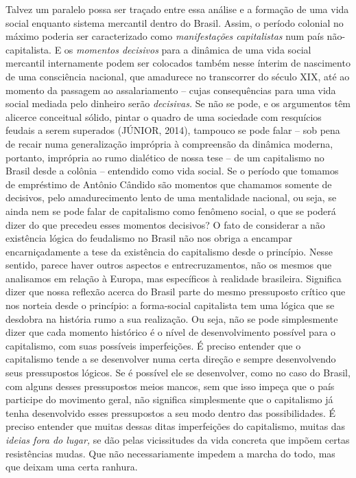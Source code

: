 Talvez um paralelo possa ser traçado entre essa análise e a formação de
uma vida social enquanto sistema mercantil dentro do Brasil. Assim, o
período colonial no máximo poderia ser caracterizado como
\emph{manifestações capitalistas} num país não-capitalista. E os
\emph{momentos decisivos} para a dinâmica de uma vida social mercantil
internamente podem ser colocados também nesse ínterim de nascimento de
uma consciência nacional, que amadurece no transcorrer do século XIX,
até ao momento da passagem ao assalariamento -- cujas consequências para
uma vida social mediada pelo dinheiro serão \emph{decisivas.} Se não se
pode, e os argumentos têm alicerce conceitual sólido, pintar o quadro de
uma sociedade com resquícios feudais a serem superados (JÚNIOR, 2014),
tampouco se pode falar -- sob pena de recair numa generalização
imprópria à compreensão da dinâmica moderna, portanto, imprópria ao rumo
dialético de nossa tese -- de um capitalismo no Brasil desde a colônia
-- entendido como vida social. Se o período que tomamos de empréstimo de
Antônio Cândido são momentos que chamamos somente de decisivos, pelo
amadurecimento lento de uma mentalidade nacional, ou seja, se ainda nem
se pode falar de capitalismo como fenômeno social, o que se poderá dizer
do que precedeu esses momentos decisivos? O fato de considerar a não
existência lógica do feudalismo no Brasil não nos obriga a encampar
encarniçadamente a tese da existência do capitalismo desde o princípio.
Nesse sentido, parece haver outros aspectos e entrecruzamentos, não os
mesmos que analisamos em relação à Europa, mas específicos à realidade
brasileira. Significa dizer que nossa reflexão acerca do Brasil parte do
mesmo pressuposto crítico que nos norteia desde o princípio: a
forma-social capitalista tem uma lógica que se desdobra na história rumo
a sua realização. Ou seja, não se pode simplesmente dizer que cada
momento histórico é o nível de desenvolvimento possível para o
capitalismo, com suas possíveis imperfeições. É preciso entender que o
capitalismo tende a se desenvolver numa certa direção e sempre
desenvolvendo seus pressupostos lógicos. Se é possível ele se
desenvolver, como no caso do Brasil, com alguns desses pressupostos
meios mancos, sem que isso impeça que o país participe do movimento
geral, não significa simplesmente que o capitalismo já tenha
desenvolvido esses pressupostos a seu modo dentro das possibilidades. É
preciso entender que muitas dessas ditas imperfeições do capitalismo,
muitas das \emph{ideias fora do lugar,} se dão pelas vicissitudes da
vida concreta que impõem certas resistências mudas. Que não
necessariamente impedem a marcha do todo, mas que deixam uma certa
ranhura.

